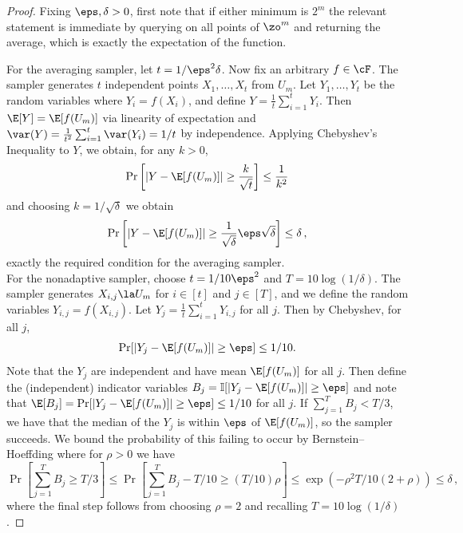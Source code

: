 \begin{proof}
Fixing $\eps,\delta>0$, first note that if either minimum is $2^m$ the relevant statement is immediate by querying on all points of $\zo^m$ and returning the average, which is exactly the expectation of the function.

For the averaging sampler, let $t=1/\eps^2\delta$. Now fix an arbitrary $f\in \cF$. The sampler generates $t$ independent points $X_1,\ldots,X_t$ from $U_m$. Let $Y_1,\ldots,Y_t$ be the random variables where $Y_i=f(X_i)$, and define $Y=\frac{1}{t}\sum_{i=1}^tY_i$. Then $\E[Y]=\E[f(U_m)]$ via linearity of expectation and $\var(Y)=\frac{1}{t^2}\sum_{i=1}^t\var(Y_i)=1/t$ by independence. Applying Chebyshev's Inequality to $Y$, we %
obtain, %
for any $k>0$,
\[\Pr\left[|Y-\E[f(U_m)]| \geq \frac{k}{\sqrt{t}}\right] \leq \frac{1}{k^2}\]
and choosing $k=1/\sqrt{\delta}$ we obtain
\[\Pr\left[|Y-\E[f(U_m)]| \geq \frac{1}{\sqrt{\delta}}\eps\sqrt{\delta}\right] \leq \delta\,,%
\]
%
exactly the required condition for the averaging sampler.\\

For the nonadaptive sampler, choose $t=1/10\eps^2$ and $T=10\log(1/\delta)$. The sampler generates $X_{i,j}\la U_m$ for $i\in[t]$ and $j\in[T]$, and we %
define the random variables $Y_{i,j}=f(X_{i,j})$. Let $Y_j=\frac{1}{t}\sum_{i=1}^tY_{i,j}$ for all $j$. Then by Chebyshev, for all $j$,
\[\Pr[|Y_j-\E[f(U_m)]| \geq \eps] \leq 1/10.\]
Note that the $Y_j$ are independent and have mean $\E[f(U_m)]$ for all $j$. Then define the (independent) indicator variables $B_j=\mathbb{I}[|Y_j-\E[f(U_m)]|\geq \eps]$ and note that $\E[B_j]=\Pr[|Y_j-\E[f(U_m)]|\geq \eps]\leq 1/10$ for all $j$. If $\sum_{j=1}^TB_j<T/3$, we have that the median of the %
$Y_j$  %
is within $\eps$ of $\E[f(U_m)]$, so the sampler succeeds. We bound the probability of this
failing 
to occur by 
%
Bernstein--Hoeffding
%
%
%
%
%
where for $\rho>0$ we have %
\[\Pr\left[\sum_{j=1}^TB_j\geq T/3\right]\leq \Pr\left[\sum_{j=1}^TB_j - T/10 \geq (T/10)\rho\right] \leq \exp(-\rho^2T/10(2+\rho))\leq \delta\,,\] %
%
where  %
the final step follows from choosing $\rho=2$ and recalling $T=10\log(1/\delta)$.
\end{proof}


